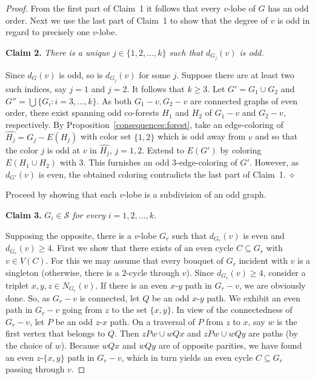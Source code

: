 \documentclass[a4paper,12pt]{article}
\numberwithin{equation}{section}
\begin{document}
\begin{proof}
From the first part of Claim~1 it follows that every $v$-lobe of $G$ has an odd order. Next we use the last part of Claim~1 to show that the degree of $v$ is odd in regard to precisely one $v$-lobe.


\bigskip

\noindent \textbf{Claim 2.} \textit{There is a unique $j\in\{1,2,\ldots,k\}$ such that $d_{G_j}(v)$ is odd.}

\medskip

\noindent Since $d_G(v)$ is odd, so is $d_{G_j}(v)$ for some $j$. Suppose there are at least two such indices, say $j=1$ and $j=2$. It follows that $k\geq3$. Let $G'=G_{1}\cup G_{2}$ and $G''=\bigcup\{G_i:i=3,\ldots,k\}$. As both $G_1-v,G_2-v$ are connected graphs of even order, there exist spanning odd co-forests $H_1$ and $H_2$ of $G_1-v$ and $G_2-v$, respectively. By Proposition~\ref{consequences:forest}, take an edge-coloring of $\widehat{H_j}=G_j-E(H_j)$ with color set $\{1,2\}$ which is odd away from $v$ and so that the color $j$ is odd at $v$ in $\widehat{H_j}$, $j=1,2$.
Extend to $E(G')$ by coloring $E(H_1\cup H_2)$ with $3$. This furnishes an odd $3$-edge-coloring of $G'$. However, as $d_{G'}(v)$ is even, the obtained coloring contradicts the last part of Claim~1. \hfill$\diamond$


\bigskip

Proceed by showing that each $v$-lobe is a subdivision of an odd graph.

\bigskip

\noindent \textbf{Claim 3.} \textit{$G_i\in \mathcal{S}$ for every $i=1,2,\ldots,k$.}

\medskip

\noindent Supposing the opposite, there is a $v$-lobe $G_r$ such that $d_{G_r}(v)$ is even and $d_{G_r}(v)\geq4$. First we show that there exists of an even cycle $C\subseteq G_r$ with $v\in V(C)$. For this we may assume that every bouquet of $G_r$ incident with $v$ is a singleton (otherwise, there is a $2$-cycle through $v$). Since $d_{G_r}(v)\geq4$, consider a triplet $x,y,z\in N_{G_r}(v)$. If there is an even $x$-$y$ path in $G_r-v$, we are obviously done. So, as $G_r-v$ is connected, let $Q$ be an odd $x$-$y$ path. We exhibit an even path in $G_r-v$ going from $z$ to the set $\{x,y\}$.  In view of the connectedness of $G_r-v$, let $P$ be an odd $z$-$x$ path. On a traversal of $P$ from $z$ to $x$, say $w$ is the first vertex that belongs to $Q$.  Then $zPw\cup wQx$ and $zPw\cup wQy$ are paths (by the choice of $w$). Because $wQx$ and $wQy$ are of opposite parities, we have found an even $z$-$\{x,y\}$ path in $G_r-v$, which in turn yields an even cycle $C\subseteq G_r$ passing through $v$.


\end{proof}
\end{document}
